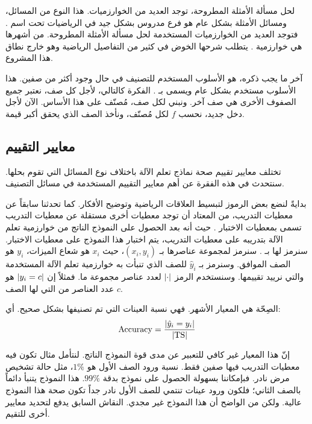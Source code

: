 لحل مسألة الأمثلة المطروحة، توجد العديد من الخوارزميات. هذا النوع من المسائل، ومسائل الأمثلة بشكل عام هو فرع
مدروس بشكل جيد في الرياضيات تحت اسم .
فتوجد العديد من الخوارزميات المستخدمة لحل مسألة الأمثلة المطروحة.
من أشهرها هي خوارزمية
%
. يتطلب شرحها الخوض في كثير من التفاصيل الرياضية وهو خارج نطاق هذا المشروع.

آخر ما يجب ذكره، هو الأسلوب المستخدم للتصنيف في حال وجود أكثر من صفين.
هذا الأسلوب مستخدم بشكل عام ويسمى بـ
%
. الفكرة كالتالي، لأجل كل صف، نعتبر جميع الصفوف الأخرى هي صف آخر.
ونبني لكل صف، مُصنّف على هذا الأساس.
الآن لأجل دخل جديد، نحسب $f$ لكل مُصنّف، ونأخذ الصف الذي يحقق أكبر قيمة.




\subsection{معايير التقييم}
\label{sec:metrics}
تختلف معايير تقييم صحة نماذج تعلم الآلة باختلاف نوع المسائل التي تقوم بحلها.
سنتحدث في هذه الفقرة عن أهم معايير التقييم المستخدمة في مسائل التصنيف.

بدايةً لنضع بعض الرموز لتبسيط العلاقات الرياضية وتوضيح الأفكار.
كما تحدثنا سابقاً عن معطيات التدريب،
من المعتاد أن توجد معطيات أخرى مستقلة عن معطيات التدريب تسمى بمعطيات الاختبار .
حيث أنه بعد الحصول على النموذج الناتج من خوارزمية تعلم الآلة بتدريبه على معطيات التدريب،
يتم اختبار هذا النموذج على معطيات الاختبار.
سنرمز لها بـ .
سنرمز لمجموعة عناصرها بـ $ (x_i, y_i) $، حيث $x_i$ هو شعاع الميزات، $y_i$ هو الصف الموافق.
وسنرمز بـ $\hat{y}_i$ للصف الذي تنبأت به خوارزمية تعلم الآلة المستخدمة والتي نرييد تقييمها.
وسنستخدم الرمز $ \left\vert\cdot\right\vert $ لعدد عناصر مجموعة ما.
فمثلاً إن $ \left\vert y_i = c\right\vert $ هو عدد العناصر من  التي لها الصف $c$.

الصِحّة  هي المعيار الأشهر. فهي نسبة العينات التي تم تصنيفها بشكل صحيح. أي:
$$ \mathrm{Accuracy} = \frac{ \left\vert\hat{y}_i = y_i\right\vert }{ \left\vert \mathrm{TS} \right\vert } $$

إنّ هذا المعيار غير كافي للتعبير عن مدى قوة النموذج الناتج.
لنتأمل مثال تكون فيه معطيات التدريب فيها صفين فقط.
نسبة ورود الصف الأول هو $1\%$،
مثل حالة تشخيص مرض نادر.
فبإمكاننا بسهولة الحصول على نموذج بدقة $99\%$.
هذا النموذج يتنبأ دائماً بالصف الثاني؛
فلكون ورود عينات تنتمي للصف الأول نادر جداً تكون صحة هذا النموذج عالية.
ولكن من الواضح أن هذا النموذج غير مجدي.
النقاش السابق يدفع لتحديد معايير أخرى للتقيم.

